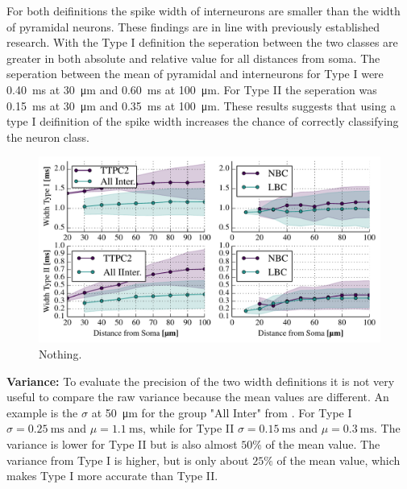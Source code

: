 \documentclass[altfont, fleqn]{uiophd}
\renewcommand{\cref}[1]{{\color{viridis_03}\mycref{#1}}}
\begin{document}
For both deifinitions the spike width of interneurons are smaller
than the width of pyramidal neurons. 
These findings are in line with previously established research.
With the Type I definition the seperation between the two classes 
are greater in both absolute and relative value for all distances from soma.
The seperation between the mean of pyramidal and interneurons 
for Type I were 
\SI{0.40}{\milli\second} at \SI{30}{\micro\metre}
and 
\SI{0.60}{\milli\second} at \SI{100}{\micro\metre}.
For Type II the seperation was 
\SI{0.15}{\milli\second} at \SI{30}{\micro\metre}
and 
\SI{0.35}{\milli\second} at \SI{100}{\micro\metre}.
These results suggests that using a type I deifinition of the spike width
increases the chance of correctly classifying the neuron class.
\newline


\begin{figure}[h]
    \begin{center}
        \includegraphics[width=1\textwidth]{images/4_2/TTPC2_NBC_LBC_IN_widths.pdf}
        \caption{
            Nothing.
        }
        \label{fig:4_2_width}
    \end{center}
\end{figure}

\noindent
\textbf{Variance:}
To evaluate the precision of the two width definitions
it is not very useful to compare the raw variance because 
the mean values are different.
An example is the $\sigma$ at 
\SI{50}{\micro\metre}
for the group "All Inter" from \cref{fig:4_2_width}.
For Type I 
$\sigma = \SI{0.25}{\milli\second}$ 
and 
$\mu = \SI{1.1}{\milli\second}$, 
while for Type II 
$\sigma = \SI{0.15}{\milli\second}$ 
and 
$\mu = \SI{0.3}{\milli\second}$. 
The variance is lower for Type II but is also
almost $50\%$ of the mean value. 
The variance from Type I is higher, but is only about 
$25\%$ of the mean value, 
which makes Type I more accurate than Type II.
\end{document}
